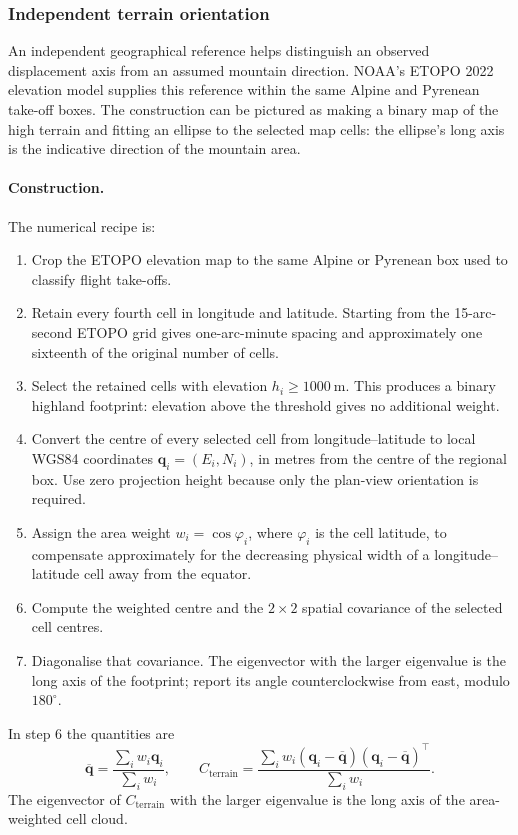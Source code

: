 \FloatBarrier
\subsubsection{Independent terrain orientation}
\label{sec:independent-terrain-axis}

An independent geographical reference helps distinguish an observed displacement
axis from an assumed mountain direction. NOAA's ETOPO 2022 elevation model
\cite{noaa_etopo2022} supplies this reference within the same Alpine and Pyrenean
take-off boxes. The construction can be pictured as making a binary map of the
high terrain and fitting an ellipse to the selected map cells: the ellipse's
long axis is the indicative direction of the mountain area.

\paragraph{Construction.}
The numerical recipe is:
\begin{enumerate}[leftmargin=*,itemsep=0.25em,topsep=0.4em]
 \item Crop the ETOPO elevation map to the same Alpine or Pyrenean box used to
 classify flight take-offs.
 \item Retain every fourth cell in longitude and latitude. Starting from the
 15-arc-second ETOPO grid gives one-arc-minute spacing and approximately one
 sixteenth of the original number of cells.
 \item Select the retained cells with elevation $h_i\ge\SI{1000}{\metre}$.
 This produces a binary highland footprint: elevation above the threshold gives
 no additional weight.
 \item Convert the centre of every selected cell from longitude--latitude to
 local WGS84 coordinates $\mathbf q_i=(E_i,N_i)$, in metres from the centre of
 the regional box. Use zero projection height because only the plan-view
 orientation is required.
 \item Assign the area weight $w_i=\cos\varphi_i$, where $\varphi_i$ is the cell
 latitude, to compensate approximately for the decreasing physical width of a
 longitude--latitude cell away from the equator.
 \item Compute the weighted centre and the $2\times2$ spatial covariance of the
 selected cell centres.
 \item Diagonalise that covariance. The eigenvector with the larger eigenvalue
 is the long axis of the footprint; report its angle counterclockwise from east,
 modulo $180^\circ$.
\end{enumerate}
In step 6 the quantities are
\begin{equation}
 \overline{\mathbf q}=
 \frac{\sum_iw_i\mathbf q_i}{\sum_iw_i},\qquad
 C_{\mathrm{terrain}}=
 \frac{\sum_iw_i(\mathbf q_i-\overline{\mathbf q})
                    (\mathbf q_i-\overline{\mathbf q})^\top}
      {\sum_iw_i}.
 \label{eq:terrain-footprint-covariance}
\end{equation}
The eigenvector of $C_{\mathrm{terrain}}$ with the larger eigenvalue is the
long axis of the area-weighted cell cloud.

